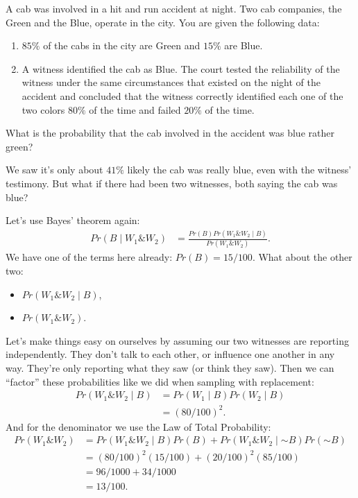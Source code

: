 \documentclass[justified]{tufte-book}
\providecommand{\tightlist}{%
  \setlength{\itemsep}{0pt}\setlength{\parskip}{0pt}}
\newcommand{\given}{\mid}
\renewcommand{\neg}{\mathbin{\sim}}
\renewcommand{\wedge}{\mathbin{\&}}
\newcommand{\p}{Pr}
\theoremstyle{definition}
\theoremstyle{definition}
\theoremstyle{definition}
\theoremstyle{remark}
\let\BeginKnitrBlock\begin \let\EndKnitrBlock\end
\begin{document}
\BeginKnitrBlock{problem}
A cab was involved in a hit and run accident at night. Two cab companies, the Green and the Blue, operate in the city. You are given the following data:

\begin{enumerate}
\def\labelenumi{\arabic{enumi}.}
\tightlist
\item
  \(85\%\) of the cabs in the city are Green and \(15\%\) are Blue.
\item
  A witness identified the cab as Blue. The court tested the reliability of the witness under the same circumstances that existed on the night of the accident and concluded that the witness correctly identified each one of the two colors \(80\%\) of the time and failed \(20\%\) of the time.
\end{enumerate}

What is the probability that the cab involved in the accident was blue rather green?
\EndKnitrBlock{problem}

We saw it's only about \(41\%\) likely the cab was really blue, even with the witness' testimony. But what if there had been two witnesses, both saying the cab was blue?

Let's use Bayes' theorem again:
\[
  \begin{aligned}
    \p(B \given W_1 \wedge W_2) &= \frac{\p(B)\p(W_1 \wedge W_2 \given B)}{\p(W_1 \wedge W_2)}.
  \end{aligned}
\]
We have one of the terms here already: \(\p(B) = 15/100\). What about the other two:

\begin{itemize}
\tightlist
\item
  \(\p(W_1 \wedge W_2 \given B)\),
\item
  \(\p(W_1 \wedge W_2)\).
\end{itemize}

Let's make things easy on ourselves by assuming our two witnesses are reporting independently. They don't talk to each other, or influence one another in any way. They're only reporting what they saw (or think they saw). Then we can ``factor'' these probabilities like we did when sampling with replacement:
\[
  \begin{aligned}
    \p(W_1 \wedge W_2 \given B) &= \p(W_1 \given B) \p(W_2 \given B)\\
                                &= (80/100)^2.
  \end{aligned}
\]
And for the denominator we use the Law of Total Probability:
\[
  \begin{aligned}
    \p(W_1 \wedge W_2) &= \p(W_1 \wedge W_2 \given B)\p(B) + 
                          \p(W_1 \wedge W_2 \given \neg B)\p(\neg B)\\
                       &= (80/100)^2(15/100) + (20/100)^2(85/100)\\
                       &= 96/1000 + 34/1000\\
                       &= 13/100.
  \end{aligned}
\]
\end{document}
